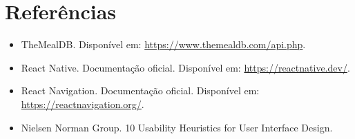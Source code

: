 \documentclass[12pt,a4paper]{article}
\begin{document}
\section{Referências}

\begin{itemize}
\item TheMealDB. Disponível em: \url{https://www.themealdb.com/api.php}.
\item React Native. Documentação oficial. Disponível em: \url{https://reactnative.dev/}.
\item React Navigation. Documentação oficial. Disponível em: \url{https://reactnavigation.org/}.
\item Nielsen Norman Group. 10 Usability Heuristics for User Interface Design.
\end{itemize}
\end{document}
